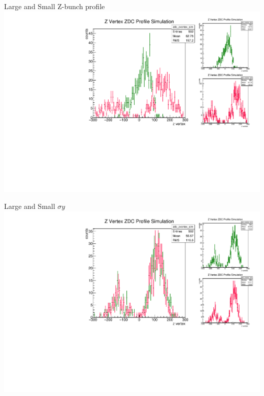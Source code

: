 \begin{frame}{Large and Small Z-bunch profile}
\includegraphics[width=\linewidth,height=\textheight,keepaspectratio]{../HourglassParameterSpace/figs/z_profile_scale.pdf}
\end{frame}

\begin{frame}{Large and Small $\sigma{y}$}
\includegraphics[width=\linewidth,height=\textheight,keepaspectratio]{../HourglassParameterSpace/figs/vsigma.pdf}
\end{frame}

